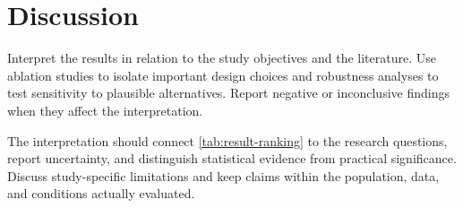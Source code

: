 \section{Discussion}
\label{sec:study-one-discussion}

Interpret the results in relation to the study objectives and the literature.
Use ablation studies to isolate important design choices and robustness analyses
to test sensitivity to plausible alternatives. Report negative or inconclusive
findings when they affect the interpretation.

The interpretation should connect \cref{tab:result-ranking} to the research
questions, report uncertainty, and distinguish statistical evidence from
practical significance. Discuss study-specific limitations and keep claims within
the population, data, and conditions actually evaluated.
